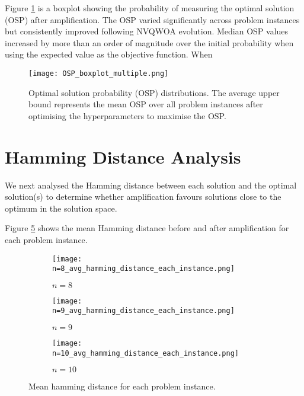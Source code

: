 Figure \ref{fig:osp} is a boxplot showing the probability of measuring the optimal solution (OSP) after amplification. The OSP varied significantly across problem instances but consistently improved following NVQWOA evolution. Median OSP values increased by more than an order of magnitude over the initial probability when using the expected value as the objective function. When

\begin{figure}[htbp]
    \centering
    \texttt{[image: OSP\_boxplot\_multiple.png]} 
    \caption{Optimal solution probability (OSP) distributions. The average upper bound represents the mean OSP over all problem instances after optimising the hyperparameters to maximise the OSP.}
    \label{fig:osp}
\end{figure}



\section{Hamming Distance Analysis}
We next analysed the Hamming distance between each solution and the optimal solution(s) to determine whether amplification favours solutions close to the optimum in the solution space.

Figure \ref{fig:avg ham} shows the mean Hamming distance before and after amplification for each problem instance.
\begin{figure}[htbp]
     \centering
     \begin{subfigure}{0.45\textwidth}
         \centering
         \texttt{[image: n=8\_avg\_hamming\_distance\_each\_instance.png]}
         \caption{$n=8$}
         \label{fig:avg ham 8}
     \end{subfigure}
     \hfill
     \begin{subfigure}{0.45\textwidth}
         \centering
         \texttt{[image: n=9\_avg\_hamming\_distance\_each\_instance.png]}
         \caption{$n=9$}
         \label{fig:avg ham 9}
     \end{subfigure}
     \hfill
     \begin{subfigure}{\textwidth}
         \centering
         \texttt{[image: n=10\_avg\_hamming\_distance\_each\_instance.png]}
         \caption{$n=10$}
         \label{fig:avg ham 10}
     \end{subfigure}
        \caption{Mean hamming distance for each problem instance.}
        \label{fig:avg ham}
\end{figure}

